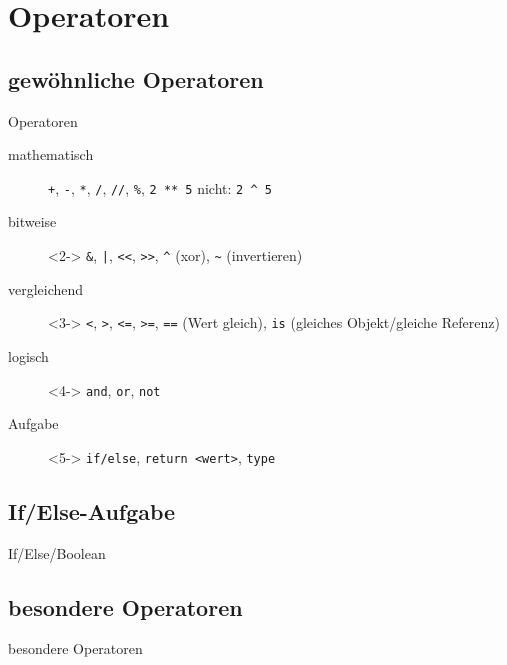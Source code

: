 \section{Operatoren}
\subsection{gewöhnliche Operatoren}
\begin{frame}[fragile]{Operatoren}
	\begin{description}
		\item[mathematisch] \alert{\texttt{+}}, \alert{\texttt{-}}, \alert{\texttt{*}}, \alert{\texttt{/}}, \alert{\texttt{//}}, \alert{\texttt{\%}}, \texttt{2 ** 5} nicht: \texttt{2 \^{} 5}
		\item[bitweise]<2-> \alert{\texttt{\&}}, \alert{\texttt{|}}, \alert{\texttt{<<}}, \alert{\texttt{>>}}, \alert{\texttt{\^}} (xor), \alert{\texttt{\~}} (invertieren)
		\item[vergleichend]<3-> \alert{\texttt{<}}, \alert{\texttt{>}}, \alert{\texttt{<=}}, \alert{\texttt{>=}}, \alert{\texttt{==}} (Wert gleich), \alert{\texttt{is}} (gleiches Objekt/gleiche Referenz)
		\item[logisch]<4-> \alert{\texttt{and}}, \alert{\texttt{or}}, \alert{\texttt{not}}
		\item[Aufgabe]<5-> \texttt{if/else}, \texttt{return <wert>}, \texttt{type}
	\end{description}
\end{frame}
\subsection{If/Else-Aufgabe}
\begin{frame}[fragile]{If/Else/Boolean}
	
\end{frame}
\subsection{besondere Operatoren}
\begin{frame}[fragile]{besondere Operatoren}
	\begin{description}
	\end{description}
\end{frame}

